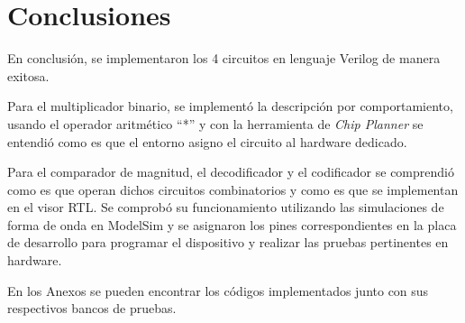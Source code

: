 \section{Conclusiones}
En conclusión, se implementaron los 4 circuitos en lenguaje Verilog de manera exitosa.

Para el multiplicador binario, se implementó la descripción por comportamiento, usando el operador aritmético ``*'' y con la herramienta de \textit{Chip Planner} se entendió como es que el entorno asigno el circuito al hardware dedicado.

Para el comparador de magnitud, el decodificador y el codificador se comprendió como es que operan dichos circuitos combinatorios y como es que se implementan en el visor RTL. Se comprobó su funcionamiento utilizando las simulaciones de forma de onda en ModelSim y se asignaron los pines correspondientes en la placa de desarrollo para programar el dispositivo y realizar las pruebas pertinentes en hardware.

En los Anexos se pueden encontrar los códigos implementados junto con sus respectivos bancos de pruebas.